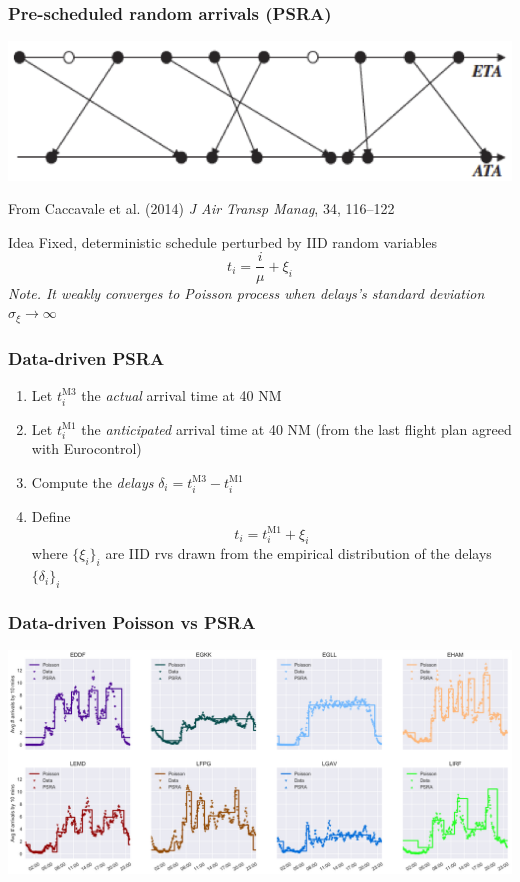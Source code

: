\documentclass[table,aspectratio=169]{beamer}
\begin{document}
\begin{frame}[t]\frametitle{Pre-scheduled random arrivals (PSRA)}
    \centering
    \includegraphics[width=.65\textwidth]{psra}

    {\tiny From Caccavale et al. (2014) \emph{J Air Transp Manag}, 34, 116--122}

    \vfill

    \begin{alertblock}{Idea}
        Fixed, deterministic schedule perturbed by IID random variables
        \[ t_i = \frac{i}{\mu} + \xi_i \]
        \emph{\alert{Note.} It weakly converges to Poisson process
        when delays's standard deviation $\sigma_{\xi} \to \infty$}
    \end{alertblock}
\end{frame}

\begin{frame}[t]\frametitle{Data-driven PSRA}
    \begin{enumerate}
        \item Let $t^{\mathrm{M3}}_i$ the \alert{\emph{actual} arrival} time at 40 NM
        \item Let $t^{\mathrm{M1}}_i$ the \alert{\emph{anticipated} arrival} time at 40 NM (from the last flight plan agreed with Eurocontrol)
        \item Compute the \emph{delays} $\delta_i = t^{\mathrm{M3}}_i - t^{\mathrm{M1}}_i$
        \item Define
        \[t_i = t^{\mathrm{M1}}_i + \xi_i\]
        where $\{\xi_i\}_i$ are IID rvs drawn from the empirical distribution of the delays $\{\delta_i\}_i$
    \end{enumerate}
\end{frame}

\begin{frame}[t]\frametitle{Data-driven Poisson vs PSRA}
    \centering
    \includegraphics[width=.9\textwidth]{mean_simul_arrivals}
\end{frame}
\end{document}
